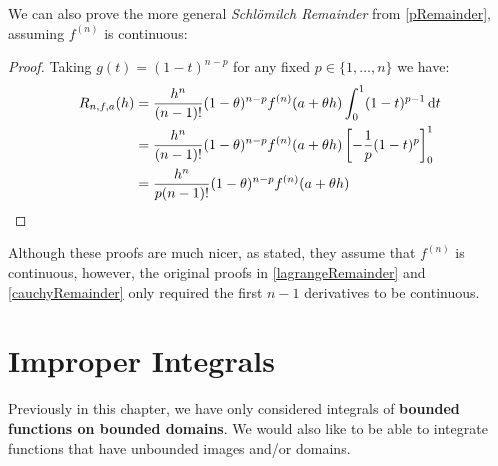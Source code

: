 \documentclass[../main.tex]{subfiles}
\begin{document}
We can also prove the more general \textit{Schl\"omilch Remainder} from \cref{pRemainder}, assuming $f^{(n)}$ is continuous:
\begin{proof}
  Taking $g(t) = (1 - t)^{n - p}$ for any fixed $p \in \{1, \ldots, n\}$ we have:
  \begin{align*}
    R_{n, f, a}(h) &= \frac{h^{n}}{(n - 1)!} (1 - \theta)^{n - p} f^{(n)}(a + \theta h) \int_{0}^{1} (1 - t)^{p - 1} \d{t} \\
                   &= \frac{h^{n}}{(n - 1)!} (1 - \theta)^{n - p} f^{(n)}(a + \theta h) \eval{-\frac{1}{p}(1 - t)^{p}}{0}{1} \\
                   &= \frac{h^{n}}{p(n - 1)!} (1 - \theta)^{n - p} f^{(n)}(a + \theta h)
  \end{align*}
\end{proof}
\begin{remark}
  Although these proofs are much nicer, as stated, they assume that $f^{(n)}$ is continuous, however, the original proofs in \cref{lagrangeRemainder} and \cref{cauchyRemainder} only required the first $n - 1$ derivatives to be continuous.
\end{remark}
\section{Improper Integrals} \label{improperIntegrals}
Previously in this chapter, we have only considered integrals of \textbf{bounded functions on bounded domains}.
We would also like to be able to integrate functions that have unbounded images and/or domains.
\end{document}
